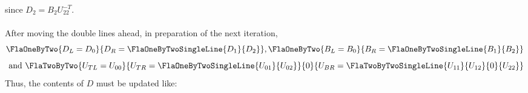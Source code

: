 since $ D_{2} = B_{2}U_{22}^{-T} $. \\
\\
After moving the double lines ahead, in preparation
of the next iteration, 
\begin{equation}
\label{eqn:teaml_ltrmmB:meaning2}
\FlaOneByTwo  { D_L = D_0 }
              { D_R = \FlaOneByTwoSingleLine{ D_1 }
                                            { D_2 } },
\FlaOneByTwo  { B_L = B_0 }
              { B_R = \FlaOneByTwoSingleLine{ B_1 }
                                            { B_2 } }
\end{equation}
\[
\mbox{ and }
\FlaTwoByTwo  { U_{TL} = U_{00} }
              { U_{TR} = \FlaOneByTwoSingleLine{ U_{01} } 
                                               { U_{02} } }
              { 0 }
              { U_{BR} = \FlaTwoByTwoSingleLine{ U_{11} } { U_{12} }
                                               {   0    } { U_{22} } }
\]
Thus, the contents of $ D $ must be updated like:
